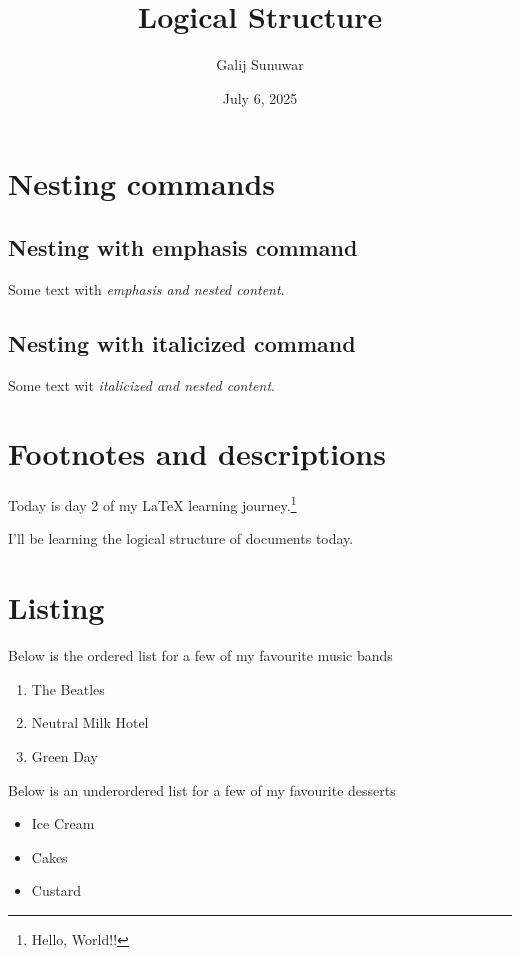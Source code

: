 \documentclass{article}
\title{\textbf{Logical Structure}}
\author{Galij Sunuwar}
\date{July 6, 2025}
\begin{document}
\maketitle
\section{Nesting commands}

\subsection{Nesting with emphasis command}
	Some text with \emph{emphasis and \emph{nested} content}.
\subsection{Nesting with italicized command}
	Some text wit \textit{italicized and \textit{nested} content}.

\section{Footnotes and descriptions}
	Today is day 2 of my LaTeX learning journey.\footnote{Hello, World!!}

	I'll be learning the logical structure of documents today.

\section{Listing}
Below is the ordered list for a few of my favourite music bands 
\begin{enumerate}

	\item The Beatles
	\item Neutral Milk Hotel
	\item Green Day
\end{enumerate}
Below is an underordered list for a few of my favourite desserts
\begin{itemize}
	\item Ice Cream
	\item Cakes
	\item Custard 

\end{itemize}
\end{document}
